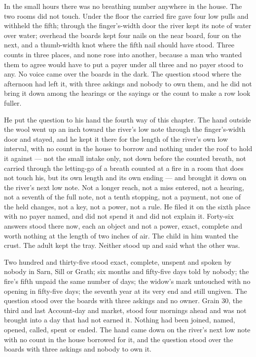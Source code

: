In the small hours there was no breathing number anywhere in the house. The two rooms did not touch. Under the floor the carried fire gave four low pulls and withheld the fifth; through the finger's-width door the river kept its note of water over water; overhead the boards kept four nails on the near board, four on the next, and a thumb-width knot where the fifth nail should have stood. Three counts in three places, and none rose into another, because a man who wanted them to agree would have to put a payer under all three and no payer stood to any. No voice came over the boards in the dark. The question stood where the afternoon had left it, with three askings and nobody to own them, and he did not bring it down among the hearings or the sayings or the count to make a row look fuller.

He put the question to his hand the fourth way of this chapter. The hand outside the wool went up an inch toward the river's low note through the finger's-width door and stayed, and he kept it there for the length of the river's own low interval, with no count in the house to borrow and nothing under the roof to hold it against --- not the small intake only, not down before the counted breath, not carried through the letting-go of a breath counted at a fire in a room that does not touch his, but its own length and its own ending --- and brought it down on the river's next low note. Not a longer reach, not a miss entered, not a hearing, not a seventh of the full note, not a tenth stopping, not a payment, not one of the held changes, not a key, not a power, not a rule. He filed it on the sixth place with no payer named, and did not spend it and did not explain it. Forty-six answers stood there now, each an object and not a power, exact, complete and worth nothing at the length of two inches of air. The child in him wanted the crust. The adult kept the tray. Neither stood up and said what the other was.

Two hundred and thirty-five stood exact, complete, unspent and spoken by nobody in Sarn, Sill or Grath; six months and fifty-five days told by nobody; the fire's fifth unpaid the same number of days; the widow's mark untouched with no opening in fifty-five days; the seventh year at its very end and still ungiven. The question stood over the boards with three askings and no owner. Grain 30, the third and last Account-day and market, stood four mornings ahead and was not brought into a day that had not earned it. Nothing had been joined, named, opened, called, spent or ended. The hand came down on the river's next low note with no count in the house borrowed for it, and the question stood over the boards with three askings and nobody to own it.
